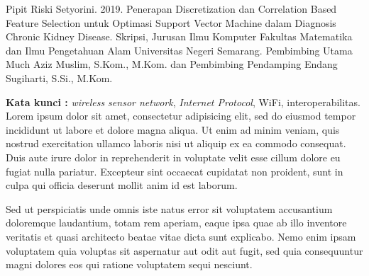 \begin{abstractind}

\noindent
Pipit Riski Setyorini. 2019. Penerapan Discretization dan Correlation Based Feature Selection untuk Optimasi Support Vector Machine dalam Diagnosis Chronic Kidney Disease. Skripsi, Jurusan Ilmu Komputer Fakultas Matematika dan Ilmu Pengetahuan Alam Universitas Negeri Semarang. Pembimbing Utama Much Aziz Muslim, S.Kom., M.Kom. dan Pembimbing Pendamping Endang Sugiharti, S.Si., M.Kom.\\
\vspace{0.5cm}


\noindent
\textbf{Kata kunci :} \emph{wireless sensor network}, \emph{Internet Protocol}, WiFi, interoperabilitas. \\

\vspace{0.5cm}
\noindent
Lorem ipsum dolor sit amet, consectetur adipisicing elit, sed do eiusmod tempor incididunt ut labore et dolore magna aliqua. Ut enim ad minim veniam, quis nostrud exercitation ullamco laboris nisi ut aliquip ex ea commodo consequat. Duis aute irure dolor in reprehenderit in voluptate velit esse cillum dolore eu fugiat nulla pariatur. Excepteur sint occaecat cupidatat non proident, sunt in culpa qui officia deserunt mollit anim id est laborum.

\noindent
Sed ut perspiciatis unde omnis iste natus error sit voluptatem accusantium doloremque laudantium, totam rem aperiam, eaque ipsa quae ab illo inventore veritatis et quasi architecto beatae vitae dicta sunt explicabo. Nemo enim ipsam voluptatem quia voluptas sit aspernatur aut odit aut fugit, sed quia consequuntur magni dolores eos qui ratione voluptatem sequi nesciunt.

\end{abstractind}

